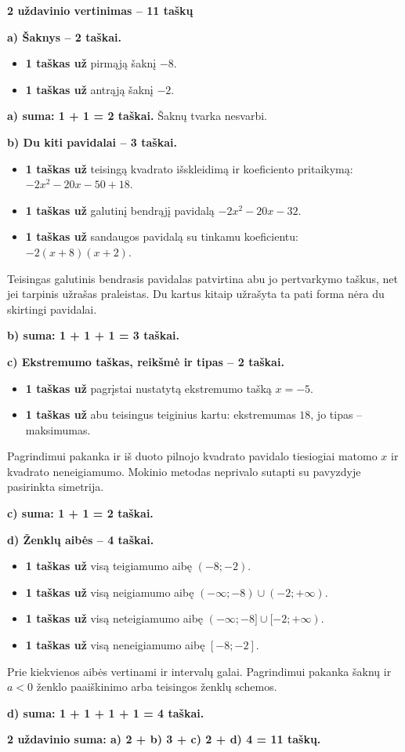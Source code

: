 \documentclass[11pt]{article}
\newcommand{\sk}[1]{\par\medskip\textbf{#1}\par}
\begin{document}
\sk{2 uždavinio vertinimas -- 11 taškų}
\textbf{a) Šaknys -- 2 taškai.}\begin{itemize}
\item \textbf{1 taškas už} pirmąją šaknį $-8$.
\item \textbf{1 taškas už} antrąją šaknį $-2$.
\end{itemize}
\textbf{a) suma: 1 + 1 = 2 taškai.} Šaknų tvarka nesvarbi.
\par\textbf{b) Du kiti pavidalai -- 3 taškai.}\begin{itemize}
\item \textbf{1 taškas už} teisingą kvadrato išskleidimą ir koeficiento pritaikymą: $-2x^2-20x-50+18$.
\item \textbf{1 taškas už} galutinį bendrąjį pavidalą $- 2 x^{2} - 20 x - 32$.
\item \textbf{1 taškas už} sandaugos pavidalą su tinkamu koeficientu: $-2(x+8)(x+2)$.
\end{itemize}
Teisingas galutinis bendrasis pavidalas patvirtina abu jo pertvarkymo taškus, net jei tarpinis užrašas praleistas. Du kartus kitaip užrašyta ta pati forma nėra du skirtingi pavidalai.\par\textbf{b) suma: 1 + 1 + 1 = 3 taškai.}
\par\textbf{c) Ekstremumo taškas, reikšmė ir tipas -- 2 taškai.}\begin{itemize}
\item \textbf{1 taškas už} pagrįstai nustatytą ekstremumo tašką $x=-5$.
\item \textbf{1 taškas už} abu teisingus teiginius kartu: ekstremumas $18$, jo tipas -- maksimumas.
\end{itemize}
Pagrindimui pakanka ir iš duoto pilnojo kvadrato pavidalo tiesiogiai matomo $x$ ir kvadrato neneigiamumo. Mokinio metodas neprivalo sutapti su pavyzdyje pasirinkta simetrija.\par\textbf{c) suma: 1 + 1 = 2 taškai.}
\par\textbf{d) Ženklų aibės -- 4 taškai.}\begin{itemize}
\item \textbf{1 taškas už} visą teigiamumo aibę $(-8;-2)$.
\item \textbf{1 taškas už} visą neigiamumo aibę $(-\infty;-8)\cup(-2;+\infty)$.
\item \textbf{1 taškas už} visą neteigiamumo aibę $(-\infty;-8]\cup[-2;+\infty)$.
\item \textbf{1 taškas už} visą neneigiamumo aibę $[-8;-2]$.
\end{itemize}
Prie kiekvienos aibės vertinami ir intervalų galai. Pagrindimui pakanka šaknų ir $a<0$ ženklo paaiškinimo arba teisingos ženklų schemos.\par\textbf{d) suma: 1 + 1 + 1 + 1 = 4 taškai.}\par\textbf{2 uždavinio suma: a) 2 + b) 3 + c) 2 + d) 4 = 11 taškų.}\newpage
\end{document}
